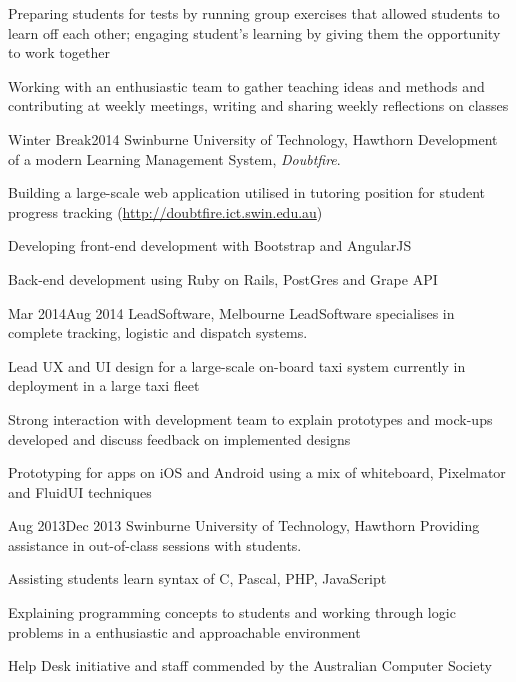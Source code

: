 {{            \item Preparing students for tests by running group exercises that allowed students to learn off each other; engaging student's learning by giving them the opportunity to work together
            \item Working with an enthusiastic team to gather teaching ideas and methods and contributing at weekly meetings, writing and sharing weekly reflections on classes
        }
        {Winter Break}{2014}
        {Swinburne University of Technology, Hawthorn}
        {Development of a modern Learning Management System, \emph{Doubtfire}.}
        {
            \item Building a large-scale web application utilised in tutoring position for student progress tracking (\href{http://doubtfire.ict.swin.edu.au}{http://doubtfire.ict.swin.edu.au})
            \item Developing front-end development with Bootstrap and AngularJS
            \item Back-end development using Ruby on Rails, PostGres and Grape API
        }
        {Mar 2014}{Aug 2014}
        {LeadSoftware, Melbourne}
        {LeadSoftware specialises in complete tracking, logistic and dispatch systems.}
        {
            \item Lead UX and UI design for a large-scale on-board taxi system currently in deployment in a large taxi fleet
            \item Strong interaction with development team to explain prototypes and mock-ups developed and discuss feedback on implemented designs
            \item Prototyping for apps on iOS and Android using a mix of whiteboard, Pixelmator and FluidUI techniques
        }
        {Aug 2013}{Dec 2013}
        {Swinburne University of Technology, Hawthorn}
        {Providing assistance in out-of-class sessions with students.}
        {
            \item Assisting students learn syntax of C, Pascal, PHP, JavaScript
            \item Explaining programming concepts to students and working through logic problems in a enthusiastic and approachable environment
            \item Help Desk initiative and staff commended by the Australian Computer Society
        }
}
